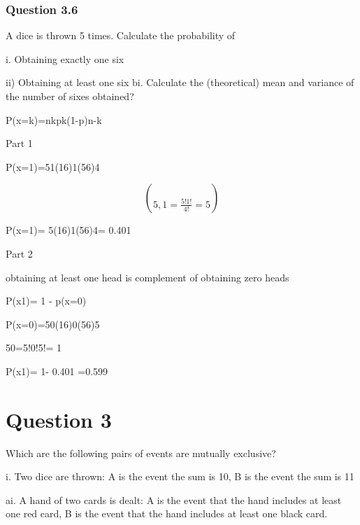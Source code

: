











\subsubsection{Question 3.6}

A dice is thrown 5 times. Calculate the probability of

i.
Obtaining exactly one six


ii)    Obtaining at least one six
bi.
Calculate the (theoretical) mean and variance of the number of sixes obtained?



P(x=k)=nkpk(1-p)n-k






Part 1 


P(x=1)=51(16)1(56)4


\[ \choose{5,1}= \frac{5!1!}{4!}= 5\]


P(x=1)= 5(16)1(56)4= 0.401 




Part 2


obtaining at least one head is complement of obtaining zero heads


P(x1)= 1 - p(x=0)



P(x=0)=50(16)0(56)5


50=5!0!5!= 1


P(x1)= 1- 0.401 =0.599 






\section*{Question 3}


Which are the following pairs of events are mutually exclusive?

i.
Two dice are thrown: A is the event the sum is 10, B is the event the sum is 11


ai.
A hand of two cards is dealt: A is the event that the hand includes at least one red card, B is the event that the hand includes at least one black card.


